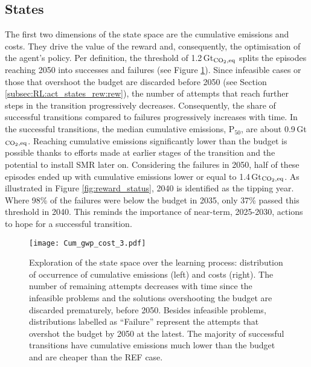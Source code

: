 \subsection{States}
\label{subsec:RL:learning:states}

The first two dimensions of the state space are the cumulative emissions and costs. They drive the value of the reward and, consequently, the optimisation of the agent's policy. Per definition, the threshold of 1.2\,Gt$_{\ce{CO2},\text{eq}}$ splits the episodes reaching 2050 into successes and failures (see Figure \ref{fig:Cum_gwp_cost}). Since infeasible cases or those that overshoot the  budget are discarded before 2050 (see Section \ref{subsec:RL:act_states_rew:rew}), the number of attempts that reach further steps in the transition progressively decreases. Consequently, the share of successful transitions compared to failures progressively increases with time. In the successful transitions, the median cumulative emissions, $\text{P}_{50}$, are about 0.9\,Gt$_{\ce{CO2},\text{eq}}$. Reaching cumulative emissions significantly lower than the  budget is possible thanks to efforts made at earlier stages of the transition and the potential to install \gls{SMR} later on. Considering the failures in 2050, half of these episodes ended up with cumulative emissions lower or equal to 1.4\,Gt$_{\ce{CO2},\text{eq}}$. As illustrated in Figure \ref{fig:reward_status}, 2040 is identified as the tipping year. Where 98\% of the failures were below the  budget in 2035, only 37\% passed this threshold in 2040. This reminds the importance of near-term, 2025-2030, actions to hope for a successful transition.

\begin{figure}[!htbp]
\centering
\texttt{[image: Cum\_gwp\_cost\_3.pdf]}
\caption{Exploration of the state space over the learning process: distribution of occurrence of cumulative emissions (left) and costs (right). The number of remaining attempts decreases with time since the infeasible problems and the solutions overshooting the  budget are discarded prematurely, \ie before 2050. Besides infeasible problems, distributions labelled as ``Failure'' represent the attempts that overshot the  budget by 2050 at the latest. The majority of successful transitions have cumulative emissions much lower than the  budget and are cheaper than the REF case. }
\label{fig:Cum_gwp_cost}
\end{figure}

